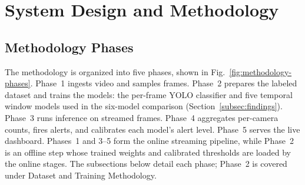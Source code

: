 \documentclass[conference]{IEEEtran}
\begin{document}





\section{System Design and Methodology}

\subsection{Methodology Phases}
\label{subsec:phases}

The methodology is organized into five phases, shown in
Fig.~\ref{fig:methodology-phases}. Phase~1 ingests video and samples
frames. Phase~2 prepares the labeled dataset and trains the models: the
per-frame YOLO classifier and five temporal window models used in the
six-model comparison (Section~\ref{subsec:findings}). Phase~3 runs
inference on streamed frames. Phase~4 aggregates per-camera counts, fires
alerts, and calibrates each model's alert level. Phase~5 serves the live
dashboard. Phases~1 and 3--5 form the online streaming pipeline, while
Phase~2 is an offline step whose trained weights and calibrated thresholds
are loaded by the online stages. The subsections below detail each phase;
Phase~2 is covered under Dataset and Training Methodology.
\end{document}
